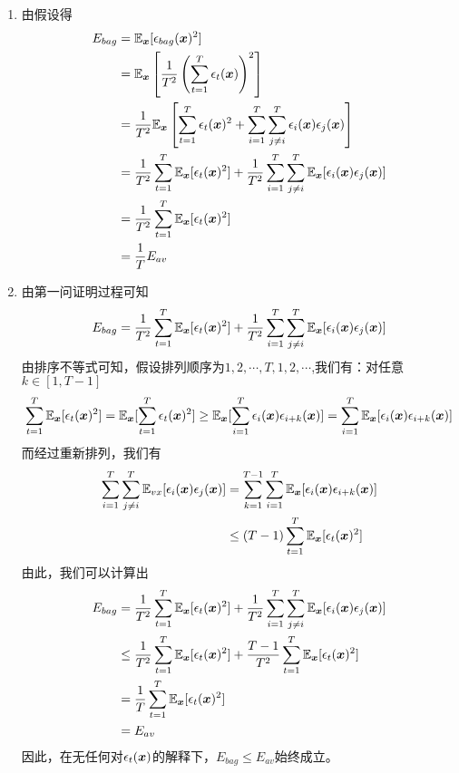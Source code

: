 \documentclass[answers]{exam}  %
\begin{document}
\begin{questions}
\begin{solution}
    \begin{enumerate}
		\item 由假设得
		\[
			\begin{aligned}
				E_{bag}
				&=\mathbb E_{{\boldsymbol{x}}}[\epsilon_{bag}({\boldsymbol{x}})^2]\\
				&=\mathbb E_{{\boldsymbol{x}}}\left[\frac1{T^2}\left(\sum^T_{t=1}\epsilon_t({\boldsymbol{x}})\right)^2 \right]\\
				&=\frac{1}{T^2}\mathbb E_{{\boldsymbol{x}}}\left[\sum^T_{t=1}\epsilon_t({\boldsymbol{x}})^2+\sum^T_{i=1}\sum^T_{j\not=i}\epsilon_i({\boldsymbol{x}})\epsilon_j({\boldsymbol{x}}) \right]\\
				&=\frac1{T^2}\sum^T_{t=1}\mathbb E_{{\boldsymbol{x}}}[\epsilon_t({\boldsymbol{x}})^2]+\frac1{T^2}\sum^T_{i=1}\sum^T_{j\not=i}\mathbb{E}_{{\boldsymbol{x}}}[\epsilon_i({\boldsymbol{x}})\epsilon_j({\boldsymbol{x}})]\\
				&=\frac1{T^2}\sum^T_{t=1}\mathbb{E}_{{\boldsymbol{x}}}[\epsilon_t({\boldsymbol{x}})^2]\\
				&=\frac{1}{T}E_{av}
			\end{aligned}	
		\]
		\item 由第一问证明过程可知
		\[
				E_{bag}=\frac1{T^2}\sum^T_{t=1}\mathbb E_{{\boldsymbol{x}}}[\epsilon_t({\boldsymbol{x}})^2]+\frac1{T^2}\sum^T_{i=1}\sum^T_{j\not=i}\mathbb{E}_{{\boldsymbol{x}}}[\epsilon_i({\boldsymbol{x}})\epsilon_j({\boldsymbol{x}})]
		\]
		由排序不等式可知，假设排列顺序为$1,2,\cdots,T,1,2,\cdots$,我们有：对任意$k\in[1,T-1]$
		\[
			\sum^T_{t=1}\mathbb{E}_{{\boldsymbol{x}}}[\epsilon_t({\boldsymbol{x}})^2]=\mathbb{E}_{{\boldsymbol{x}}}[\sum^T_{t=1}\epsilon_t({\boldsymbol{x}})^2]\ge \mathbb E_{{\boldsymbol{x}}}[\sum^T_{i=1}\epsilon_i({\boldsymbol{x}})\epsilon_{i+k}({\boldsymbol{x}})]=\sum^T_{i=1}\mathbb E_{{\boldsymbol{x}}}[\epsilon_i({\boldsymbol{x}})\epsilon_{i+k}({\boldsymbol{x}})]
		\]
		而经过重新排列，我们有
		\[
			\begin{aligned}
				\sum^T_{i=1}\sum^T_{j\not=i}\mathbb{E}_{vx}[\epsilon_i({\boldsymbol{x}})\epsilon_j({\boldsymbol{x}})]
				&=\sum^{T-1}_{k=1}\sum^T_{i=1}\mathbb{E}_{{\boldsymbol{x}}}[\epsilon_i({\boldsymbol{x}})\epsilon_{i+k}({\boldsymbol{x}})] \\
				&\le (T-1)\sum^T_{t=1}\mathbb{E}_{{\boldsymbol{x}}}[\epsilon_t({\boldsymbol{x}})^2]
			\end{aligned}
		\]
		由此，我们可以计算出
		\[ 
			\begin{aligned}
				E_{bag}
				&=\frac1{T^2}\sum^T_{t=1}\mathbb E_{{\boldsymbol{x}}}[\epsilon_t({\boldsymbol{x}})^2]+\frac1{T^2}\sum^T_{i=1}\sum^T_{j\not=i}\mathbb{E}_{{\boldsymbol{x}}}[\epsilon_i({\boldsymbol{x}})\epsilon_j({\boldsymbol{x}})]\\
				&\le \frac1{T^2}\sum^T_{t=1}\mathbb E_{{\boldsymbol{x}}}[\epsilon_t({\boldsymbol{x}})^2]+\frac{T-1}{T^2}\sum^T_{t=1}\mathbb E_{{\boldsymbol{x}}}[\epsilon_t({\boldsymbol{x}})^2]\\
				&=\frac1T\sum^T_{t=1}\mathbb E_{{\boldsymbol{x}}}[\epsilon_t({\boldsymbol{x}})^2]\\
				&=E_{av}
			\end{aligned}	
		\]
		因此，在无任何对$\epsilon_t({\boldsymbol{x}})$的解释下，$E_{bag}\le E_{av}$始终成立。
	\end{enumerate}
\end{solution}


\end{questions}
\end{document}
